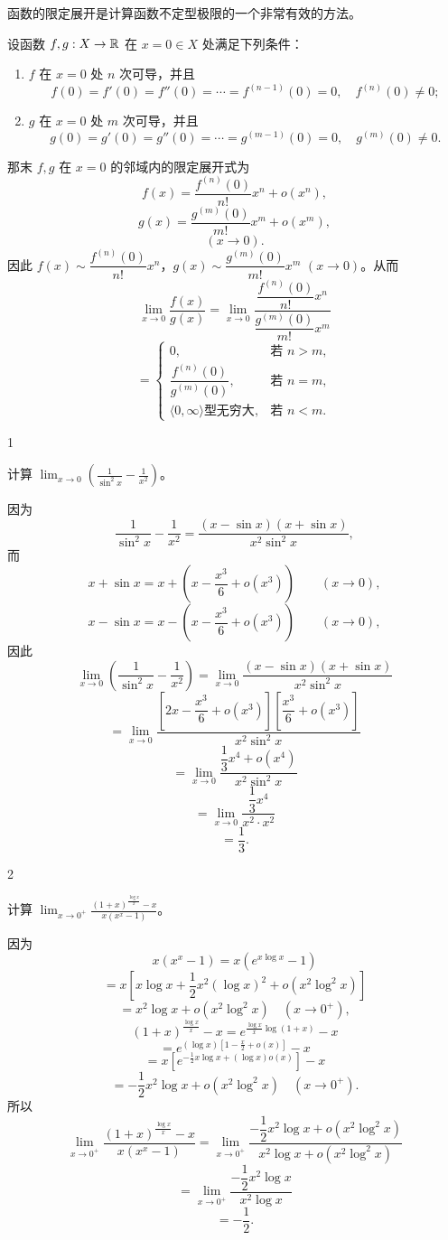 函数的限定展开是计算函数不定型极限的一个非常有效的方法。

设函数 $f,g:X\to\mathbb{R}$ 在 $x=0\in X$ 处满足下列条件：

\begin{enumerate}[label=\arabic{enumi})]
\item $f$ 在 $x=0$ 处 $n$ 次可导，并且
\[f(0)=f'(0)=f''(0)=\cdots=f^{(n-1)}(0)=0,\quad f^{(n)}(0)\neq0;\]
\item $g$ 在 $x=0$ 处 $m$ 次可导，并且
\[g(0)=g'(0)=g''(0)=\cdots=g^{(m-1)}(0)=0,\quad g^{(m)}(0)\neq0.\]
\end{enumerate}

那末 $f,g$ 在 $x=0$ 的邻域内的限定展开式为
\[f(x)=\frac{f^{(n)}(0)}{n!}x^n+o(x^n),\]
\[g(x)=\frac{g^{(m)}(0)}{m!}x^m+o(x^m),\]
\[(x\to0).\]
因此 $f(x)\sim\dfrac{f^{(n)}(0)}{n!}x^n$，$g(x)\sim\dfrac{g^{(m)}(0)}{m!}x^m$ $(x\to0)$。从而
\[\lim_{x\to0}\frac{f(x)}{g(x)}=\lim_{x\to0}\frac{\dfrac{f^{(n)}(0)}{n!}x^n}{\dfrac{g^{(m)}(0)}{m!}x^m}\]
\[=\begin{cases} 0, & \text{若 }n>m, \\[1ex] \dfrac{f^{(n)}(0)}{g^{(m)}(0)}, & \text{若 }n=m, \\[1ex] \langle0,\infty\rangle\text{型无穷大}, & \text{若 }n<m. \end{cases}\]

\begin{sourceexample}{1}

计算 $\displaystyle\lim_{x\to0}\left(\frac{1}{\sin^2x}-\frac{1}{x^2}\right)$。

因为
\[\frac{1}{\sin^2x}-\frac{1}{x^2}=\frac{(x-\sin x)(x+\sin x)}{x^2\sin^2x},\]
而
\[x+\sin x=x+\left(x-\frac{x^3}{6}+o(x^3)\right)\qquad(x\to0),\]
\[x-\sin x=x-\left(x-\frac{x^3}{6}+o(x^3)\right)\qquad(x\to0),\]
因此
\[\lim_{x\to0}\left(\frac{1}{\sin^2x}-\frac{1}{x^2}\right)=\lim_{x\to0}\frac{(x-\sin x)(x+\sin x)}{x^2\sin^2x}\]
\[=\lim_{x\to0}\frac{\left[2x-\dfrac{x^3}{6}+o(x^3)\right]\left[\dfrac{x^3}{6}+o(x^3)\right]}{x^2\sin^2x}\]
\[=\lim_{x\to0}\frac{\dfrac13x^4+o(x^4)}{x^2\sin^2x}\]
\[=\lim_{x\to0}\frac{\dfrac13x^4}{x^2\cdot x^2}\]
\[=\frac13.\]

\end{sourceexample}

\begin{sourceexample}{2}

计算 $\displaystyle\lim_{x\to0^+}\frac{(1+x)^{\frac{\log x}{x}}-x}{x(x^x-1)}$。

因为
\[x(x^{x}-1)=x(e^{x\log x}-1)\]
\[=x\left[x\log x+\frac{1}{2}x^{2}(\log x)^{2}+o(x^{2}\log^{2}x)\right]\]
\[=x^{2}\log x+o(x^{2}\log^{2}x)\quad(x\to0^{+}),\]
\[(1+x)^{\frac{\log x}{x}}-x=e^{\frac{\log x}{x}\log(1+x)}-x\]
\[=e^{(\log x)\left[1-\frac{x}{2}+o(x)\right]}-x\]
\[=x\left[e^{-\frac{1}{2}x\log x+(\log x)o(x)}\right]-x\]
\[=-\frac{1}{2}x^{2}\log x+o(x^{2}\log^{2}x)\quad(x\to0^{+}).\]
所以
\[\lim_{x\to0^{+}}\frac{(1+x)^{\frac{\log x}{x}}-x}{x(x^{x}-1)}=\lim_{x\to0^{+}}\frac{-\dfrac{1}{2}x^{2}\log x+o(x^{2}\log^{2}x)}{x^{2}\log x+o(x^{2}\log^{2}x)}\]
\[=\lim_{x\to0^{+}}\frac{-\dfrac{1}{2}x^{2}\log x}{x^{2}\log x}\]
\[=-\frac{1}{2}.\]

\end{sourceexample}

